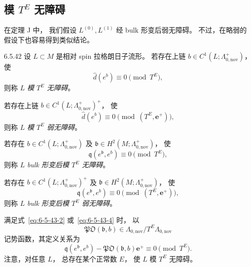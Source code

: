 
\subsection{模 $T^E$ 无障碍}
\label{subsec:6-5-5}

在定理 J 中，
我们假设 $L^{(0)},L^{(1)}$
经 bulk 形变后弱无障碍。
不过，在略弱的假设下也容易得到类似结论。

\begin{definition}{6.5.42}\label{def:6-5-42}
设 $L\subset M$ 是相对 spin
拉格朗日子流形。
若存在上链
$b\in C^1(L;\Lambda_{0,\mathrm{nov}}^+)$，
使
\begin{equation}
\widehat d(e^b)\equiv0
\pmod{T^E},
\tag{6.5.43.1}\label{eq:6-5-43-1}
\end{equation}
则称 $L$ \emph{模 $T^E$ 无障碍}。

若存在上链
$b\in C^1(L;\Lambda_{0,\mathrm{nov}}^+)^+$，
使
\begin{equation}
\widehat d(e^b)\equiv0
\pmod{(T^E,\mathbf e^+)},
\tag{6.5.43.2}\label{eq:6-5-43-2}
\end{equation}
则称 $L$ \emph{模 $T^E$ 弱无障碍}。

若存在
$b\in C^1(L;\Lambda_{0,\mathrm{nov}}^+)$
及
$\mathfrak b\in H^2(M;\Lambda_{0,\mathrm{nov}}^+)$，
使
\begin{equation}
\mathfrak q(e^{\mathfrak b},e^b)
\equiv0\pmod{T^E},
\tag{6.5.43.3}\label{eq:6-5-43-3}
\end{equation}
则称 $L$ \emph{bulk 形变后模 $T^E$ 无障碍}。

若存在
$b\in C^1(L;\Lambda_{0,\mathrm{nov}}^+)^+$
及
$\mathfrak b\in H^2(M;\Lambda_{0,\mathrm{nov}}^+)$，
使
\begin{equation}
\mathfrak q(e^{\mathfrak b},e^b)
\equiv0\pmod{(T^E,\mathbf e^+)},
\tag{6.5.43.4}\label{eq:6-5-43-4}
\end{equation}
则称 $L$ \emph{bulk 形变后模 $T^E$ 弱无障碍}。
\end{definition}

满足式~\eqref{eq:6-5-43-2}
或~\eqref{eq:6-5-43-4} 时，
以
\[
\mathfrak{PO}(\mathfrak b,b)
\in
\Lambda_{0,\mathrm{nov}}/
T^E\Lambda_{0,\mathrm{nov}}
\]
记势函数，其定义关系为
\[
\mathfrak q(e^{\mathfrak b},e^b)
-\mathfrak{PO}(\mathfrak b,b)\mathbf e^+
\equiv0\pmod{T^E}.
\]
注意，对任意 $L$，
总存在某个正常数 $E$，
使 $L$ 模 $T^E$ 无障碍。

